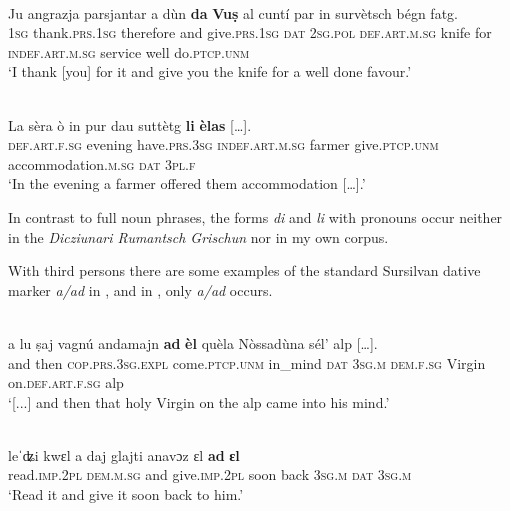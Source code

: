 \ea
{}\\
\gll  Ju angrazja parsjantar a dùn \textbf{da} \textbf{Vuṣ} al cuntí par in survètsch bégn fatg.\\
    \textsc{1sg} thank.\textsc{prs.1sg} therefore and give.\textsc{prs.1sg} \textsc{dat} \textsc{2sg.pol} \textsc{def.art.m.sg} knife for \textsc{indef.art.m.sg} service well do.\textsc{ptcp.unm}\\
\glt `I thank [you] for it and give you the knife for a well done favour.'
\z

 \ea
{}\\
\gll  La sèra ò in pur dau suttètg \textbf{li} \textbf{èlas} […].\\
     \textsc{def}.\textsc{art}.\textsc{f}.\textsc{sg} evening have.\textsc{prs}.3\textsc{sg} \textsc{indef}.\textsc{art}.\textsc{m}.\textsc{sg} farmer give.\textsc{ptcp.unm} accommodation.\textsc{m.sg} \textsc{dat} \textsc{3pl.f}\\
\glt `In the evening a farmer offered them accommodation […].'
\z

In contrast to full noun phrases, the forms \textit{di} and \textit{li} with pronouns occur neither in the \textit{Dicziunari Rumantsch Grischun} nor in my own corpus.

With third persons there are some examples of the standard Sursilvan dative marker \textit{a/ad} in \citet{Büchli1966}, and in \citet{Gartner1910}, only \textit{a/ad} occurs.

\ea
{}\\
\gll  […] a lu ṣaj vagnú andamajn \textbf{ad} \textbf{èl} quèla Nòssadùna sél’ alp […].\\
{} and then \textsc{cop.prs.3sg.expl} come.\textsc{ptcp.unm} in\_mind \textsc{dat} \textsc{3sg.m} \textsc{dem.f.sg} Virgin on.\textsc{def.art.f.sg} alp \\
\glt `[...] and then that holy Virgin on the alp came into his mind.'
\z

\ea
{}\\
\gll leˈʥi kwɛl a daj glajti anavɔz ɛl \textbf{ad} \textbf{ɛl}\\
     read.\textsc{imp.2pl} \textsc{dem.m.sg} and give.\textsc{imp.2pl} soon back \textsc{3sg.m} \textsc{dat} \textsc{3sg.m}\\
\glt `Read it and give it soon back to him.'
\z

